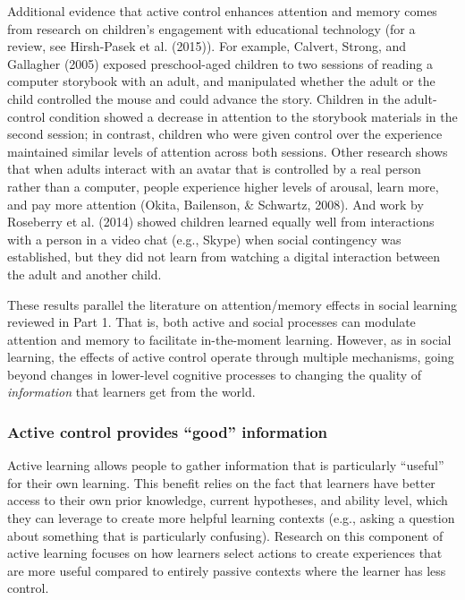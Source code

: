 \documentclass[english,man]{apa6}
\theoremstyle{definition}
\theoremstyle{definition}
\theoremstyle{definition}
\theoremstyle{remark}
\begin{document}
Additional evidence that active control enhances attention and memory
comes from research on children's engagement with educational technology
(for a review, see Hirsh-Pasek et al. (2015)). For example, Calvert,
Strong, and Gallagher (2005) exposed preschool-aged children to two
sessions of reading a computer storybook with an adult, and manipulated
whether the adult or the child controlled the mouse and could advance
the story. Children in the adult-control condition showed a decrease in
attention to the storybook materials in the second session; in contrast,
children who were given control over the experience maintained similar
levels of attention across both sessions. Other research shows that when
adults interact with an avatar that is controlled by a real person
rather than a computer, people experience higher levels of arousal,
learn more, and pay more attention (Okita, Bailenson, \& Schwartz,
2008). And work by Roseberry et al. (2014) showed children learned
equally well from interactions with a person in a video chat (e.g.,
Skype) when social contingency was established, but they did not learn
from watching a digital interaction between the adult and another child.

These results parallel the literature on attention/memory effects in
social learning reviewed in Part 1. That is, both active and social
processes can modulate attention and memory to facilitate in-the-moment
learning. However, as in social learning, the effects of active control
operate through multiple mechanisms, going beyond changes in lower-level
cognitive processes to changing the quality of \emph{information} that
learners get from the world.

\subsubsection{\texorpdfstring{Active control provides \enquote{good}
information}{Active control provides good information}}\label{active-control-provides-good-information}

Active learning allows people to gather information that is particularly
\enquote{useful} for their own learning. This benefit relies on the fact
that learners have better access to their own prior knowledge, current
hypotheses, and ability level, which they can leverage to create more
helpful learning contexts (e.g., asking a question about something that
is particularly confusing). Research on this component of active
learning focuses on how learners select actions to create experiences
that are more useful compared to entirely passive contexts where the
learner has less control.
\end{document}
